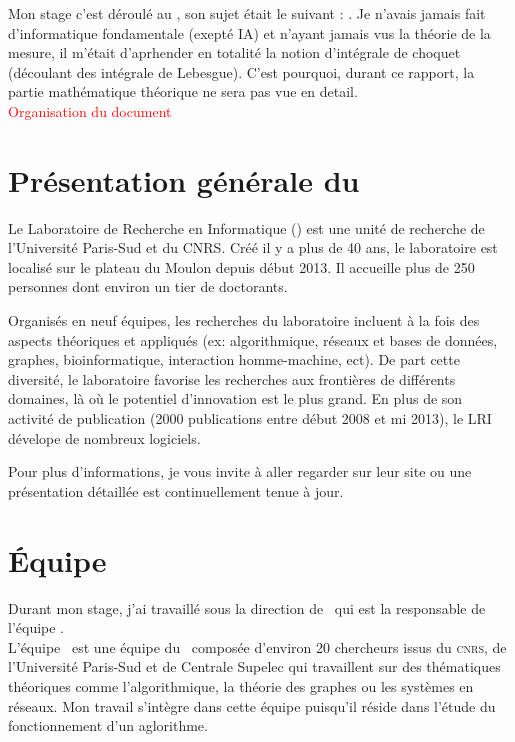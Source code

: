 
Mon stage c'est déroulé au \Lri, son sujet était le suivant : \textit{\sujet}.
Je n'avais jamais fait d'informatique fondamentale (exepté IA)
et n'ayant jamais vus la théorie de la mesure,
il m'était d'aprhender en totalité la notion d'intégrale de choquet (découlant des intégrale de Lebesgue).
C'est pourquoi, durant ce rapport, la partie mathématique théorique ne sera pas vue en detail.\\
\textcolor{red}{Organisation du document}

\section{Présentation générale du \lri}
\label{sec:pglri}

Le Laboratoire de Recherche en Informatique (\lri) est une unité de recherche de l'Université
Paris-Sud et du \textsc{CNRS}.
Créé il y a plus de 40 ans, le laboratoire est localisé sur le plateau du Moulon depuis début 2013.
Il accueille plus de 250 personnes dont environ un tier de doctorants.


Organisés en neuf équipes, les recherches du laboratoire incluent à la fois des aspects théoriques et appliqués
(ex: algorithmique, réseaux et bases de données, graphes, bioinformatique, interaction homme-machine, ect).
De part cette diversité, le laboratoire favorise les recherches aux frontières de différents domaines,
là où le potentiel d'innovation est le plus grand.
En plus de son activité de publication (2000 publications entre début 2008 et mi 2013),
le LRI dévelope de nombreux logiciels.


Pour plus d'informations, je vous invite à aller regarder sur leur site
ou une présentation détaillée est continuellement tenue à jour\cite{LRI}.


\section{Équipe \galac}
\label{sec:galac}

Durant mon stage, j'ai travaillé sous la direction de \johanne\ qui est la responsable de l'équipe \galac. \\
L'équipe \galac\ est une équipe du \lri\ composée d'environ 20 chercheurs issus du \textsc{cnrs}, de l'Université
Paris-Sud et de Centrale Supelec qui travaillent sur des thématiques théoriques comme
l'algorithmique, la théorie des graphes ou les systèmes en réseaux.
Mon travail s'intègre dans cette équipe puisqu'il réside dans l'étude du fonctionnement d'un aglorithme.
